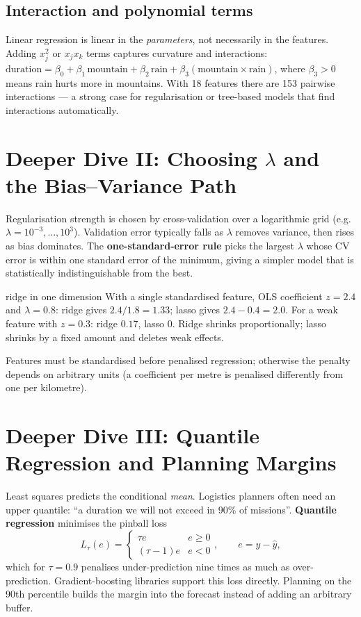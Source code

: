 \documentclass[11pt]{article}
\begin{document}
\subsection{Interaction and polynomial terms}
Linear regression is linear in the \emph{parameters}, not necessarily in the features. Adding $x_j^2$ or $x_jx_k$ terms captures curvature and interactions: $\text{duration}=\beta_0+\beta_1\,\text{mountain}+\beta_2\,\text{rain}+\beta_3(\text{mountain}\times\text{rain})$, where $\beta_3>0$ means rain hurts more in mountains. With 18 features there are 153 pairwise interactions --- a strong case for regularisation or tree-based models that find interactions automatically.

\section{Deeper Dive II: Choosing $\lambda$ and the Bias--Variance Path}
Regularisation strength is chosen by cross-validation over a logarithmic grid (e.g.\ $\lambda=10^{-3},\ldots,10^{3}$). Validation error typically falls as $\lambda$ removes variance, then rises as bias dominates. The \textbf{one-standard-error rule} picks the largest $\lambda$ whose CV error is within one standard error of the minimum, giving a simpler model that is statistically indistinguishable from the best.
\begin{example}{ridge in one dimension}
With a single standardised feature, OLS coefficient $z=2.4$ and $\lambda=0.8$: ridge gives $2.4/1.8=1.33$; lasso gives $2.4-0.4=2.0$. For a weak feature with $z=0.3$: ridge $0.17$, lasso $0$. Ridge shrinks proportionally; lasso shrinks by a fixed amount and deletes weak effects.
\end{example}
Features must be standardised before penalised regression; otherwise the penalty depends on arbitrary units (a coefficient per metre is penalised differently from one per kilometre).

\section{Deeper Dive III: Quantile Regression and Planning Margins}
Least squares predicts the conditional \emph{mean}. Logistics planners often need an upper quantile: ``a duration we will not exceed in 90\% of missions''. \textbf{Quantile regression} minimises the pinball loss
\[L_\tau(e)=\begin{cases}\tau e & e\ge0\\(\tau-1)e & e<0\end{cases},\qquad e=y-\hat y,\]
which for $\tau=0.9$ penalises under-prediction nine times as much as over-prediction. Gradient-boosting libraries support this loss directly. Planning on the 90th percentile builds the margin into the forecast instead of adding an arbitrary buffer.
\end{document}
